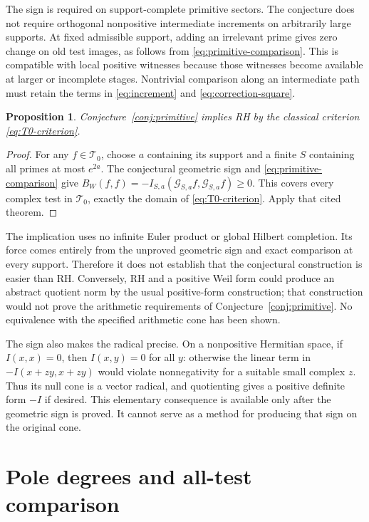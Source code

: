 \documentclass[11pt,letterpaper]{article}
\newtheorem{proposition}[theorem]{Proposition}
\theoremstyle{definition}
\theoremstyle{remark}
\newcommand{\T}{\mathcal T}
\begin{document}
The sign is required on support-complete primitive sectors.
The conjecture does not require orthogonal nonpositive
intermediate increments on arbitrarily large supports.
At fixed admissible support, adding an irrelevant prime gives
zero change on old test images, as follows from
\eqref{eq:primitive-comparison}. This is compatible with local
positive witnesses because those witnesses become available at
larger or incomplete stages. Nontrivial comparison along an
intermediate path must retain the terms in
\eqref{eq:increment} and \eqref{eq:correction-square}.

\begin{proposition}\label{prop:RH-consequence}
Conjecture~\ref{conj:primitive} implies RH by the classical
criterion \eqref{eq:T0-criterion}.
\end{proposition}
\begin{proof}
For any $f\in\T_0$, choose $a$ containing its support and a
finite $S$ containing all primes at most $e^{2a}$. The conjectural
geometric sign and \eqref{eq:primitive-comparison} give
$B_W(f,f)=-I_{S,a}(\mathcal G_{S,a}f,\mathcal G_{S,a}f)\ge0$.
This covers every complex test in $\T_0$, exactly the domain of
\eqref{eq:T0-criterion}. Apply that cited theorem.
\end{proof}

The implication uses no infinite Euler product or global Hilbert
completion. Its force comes entirely from the unproved geometric
sign and exact comparison at every support. Therefore it does
not establish that the conjectural construction is easier than
RH. Conversely, RH and a positive Weil form could produce an
abstract quotient norm by the usual positive-form construction;
that construction would not prove the arithmetic requirements
of Conjecture~\ref{conj:primitive}. No equivalence with the
specified arithmetic cone has been shown.

The sign also makes the radical precise. On a nonpositive
Hermitian space, if $I(x,x)=0$, then $I(x,y)=0$ for all $y$:
otherwise the linear term in $-I(x+zy,x+zy)$ would violate
nonnegativity for a suitable small complex $z$. Thus its null
cone is a vector radical, and quotienting gives a positive
definite form $-I$ if desired. This elementary consequence is
available only after the geometric sign is proved. It cannot
serve as a method for producing that sign on the original cone.

\section{Pole degrees and all-test comparison}
\end{document}

